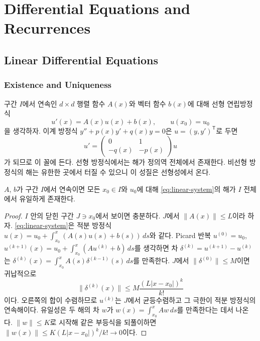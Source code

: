 \chapter{Differential Equations and Recurrences}
\label{ch:recurrences}



\section{Linear Differential Equations}
\label{sec:ode}

\subsection{Existence and Uniqueness}

구간 $I$에서 연속인 $d\times d$ 행렬 함수 $A(x)$와 벡터 함수 $b(x)$에 대해 선형 연립방정식
\begin{equation}
\label{eq:linear-system}
u'(x)=A(x)u(x)+b(x),\qquad u(x_0)=u_0
\end{equation}
을 생각하자. 이계 방정식 $y''+p(x)y'+q(x)y=0$은 $u=(y,y')^{\mathsf T}$로 두면
\[
u'=\begin{pmatrix}0&1\\-q(x)&-p(x)\end{pmatrix}u
\]
가 되므로 이 꼴에 든다. 선형 방정식에서는 해가 정의역 전체에서 존재한다. 비선형 방정식의 해는 유한한 곳에서 터질 수 있으니 이 성질은 선형성에서 온다.

\begin{theorem}
\label{thm:ode-exist}
$A$, $b$가 구간 $I$에서 연속이면 모든 $x_0\in I$와 $u_0$에 대해 \cref{eq:linear-system}의 해가 $I$ 전체에서 유일하게 존재한다.
\end{theorem}

\begin{proof}
$I$ 안의 닫힌 구간 $J\ni x_0$에서 보이면 충분하다. $J$에서 $\|A(x)\|\le L$이라 하자. \cref{eq:linear-system}은 적분 방정식 $u(x)=u_0+\int_{x_0}^x(A(s)u(s)+b(s))\,ds$와 같다. Picard 반복 $u^{(0)}=u_0$, $u^{(k+1)}(x)=u_0+\int_{x_0}^x(Au^{(k)}+b)\,ds$를 생각하면 차 $\delta^{(k)}=u^{(k+1)}-u^{(k)}$는 $\delta^{(k)}(x)=\int_{x_0}^xA(s)\delta^{(k-1)}(s)\,ds$를 만족한다. $J$에서 $\|\delta^{(0)}\|\le M$이면 귀납적으로
\[
\|\delta^{(k)}(x)\|\le M\frac{(L|x-x_0|)^k}{k!}
\]
이다. 오른쪽의 합이 수렴하므로 $u^{(k)}$는 $J$에서 균등수렴하고 그 극한이 적분 방정식의 연속해이다. 유일성은 두 해의 차 $w$가 $w(x)=\int_{x_0}^xAw\,ds$를 만족한다는 데서 나온다. $\|w\|\le K$로 시작해 같은 부등식을 되풀이하면 $\|w(x)\|\le K(L|x-x_0|)^k/k!\to0$이다.
\end{proof}

